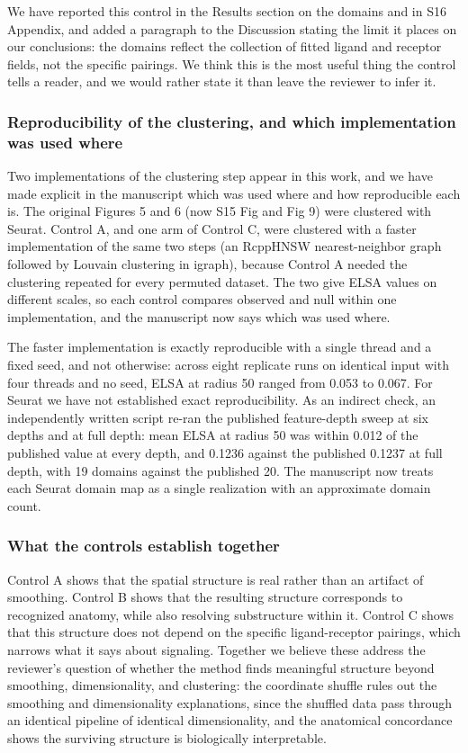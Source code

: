 \documentclass[11pt]{article}
\begin{document}
We have reported this control in the Results section on the domains and in S16 Appendix, and
added a paragraph to the Discussion stating the limit it places on our conclusions: the domains reflect the collection
of fitted ligand and receptor fields, not the specific pairings. We think this is the most
useful thing the control tells a reader, and we would rather state it than leave the
reviewer to infer it.

\subsubsection*{Reproducibility of the clustering, and which implementation was used where}

Two implementations of the clustering step appear in this work, and we have made explicit in
the manuscript which was used where and how reproducible each is. The original Figures 5 and 6 (now S15 Fig and Fig 9) were clustered with Seurat. Control A, and one arm of Control C,
were clustered with a faster implementation of the same two steps (an RcppHNSW
nearest-neighbor graph followed by Louvain clustering in igraph), because Control A needed
the clustering repeated for every permuted dataset. The two give ELSA values on different
scales, so each control compares observed and null within one implementation, and the
manuscript now says which was used where.

The faster implementation is exactly reproducible with a single thread and a fixed seed, and
not otherwise: across eight replicate runs on identical input with four threads and no seed,
ELSA at radius 50 ranged from 0.053 to 0.067. For Seurat we have not established exact
reproducibility. As an indirect check, an independently written script re-ran the published
feature-depth sweep at six depths and at full depth: mean ELSA at radius 50 was within 0.012
of the published value at every depth, and 0.1236 against the published 0.1237 at full
depth, with 19 domains against the published 20. The manuscript now treats each Seurat
domain map as a single realization with an approximate domain count.

\subsubsection*{What the controls establish together}

Control A shows that the spatial structure is real rather than an artifact of smoothing.
Control B shows that the resulting structure corresponds to recognized anatomy, while also
resolving substructure within it. Control C shows that this structure does not depend on the
specific ligand-receptor pairings, which narrows what it says about signaling. Together we believe these address the reviewer's question
of whether the method finds meaningful structure beyond smoothing, dimensionality, and
clustering: the coordinate shuffle rules out the smoothing and dimensionality explanations,
since the shuffled data pass through an identical pipeline of identical dimensionality, and
the anatomical concordance shows the surviving structure is biologically interpretable.
\end{document}
